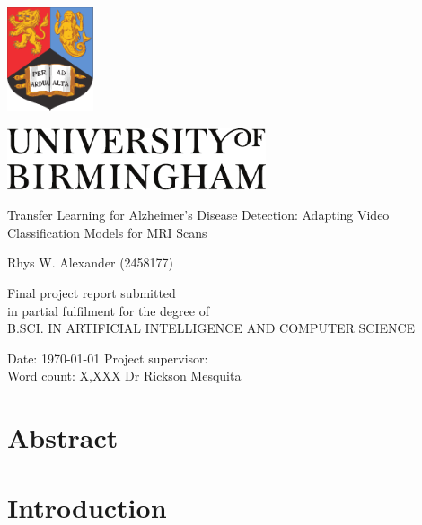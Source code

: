\documentclass[11pt, a4paper]{article}
\begin{document}
\onehalfspacing

\begin{titlepage}

\begin{center}
\includegraphics[width=1in]{figures/bham_crest}

\vspace{0.3in}

\includegraphics[width=3in]{figures/bham_logo}

\vspace{2in}

{\LARGE Transfer Learning for Alzheimer’s Disease Detection: Adapting Video Classification Models for MRI Scans }

\vspace{0.7in}

{\Large Rhys W. Alexander (2458177)}

\vfill{}
Final project report submitted\\ 
in partial fulfilment for the degree of\\
B.SCI. IN ARTIFICIAL INTELLIGENCE AND COMPUTER SCIENCE
\end{center}

\vspace{0.4in}
Date: \today{}     \hfill{} Project supervisor: \\
Word count: X,XXX   \hfill{} Dr Rickson Mesquita
\end{titlepage}

\setcounter{tocdepth}{2}
\tableofcontents

\newpage{}

\section{Abstract}

\section{Introduction}
\end{document}
